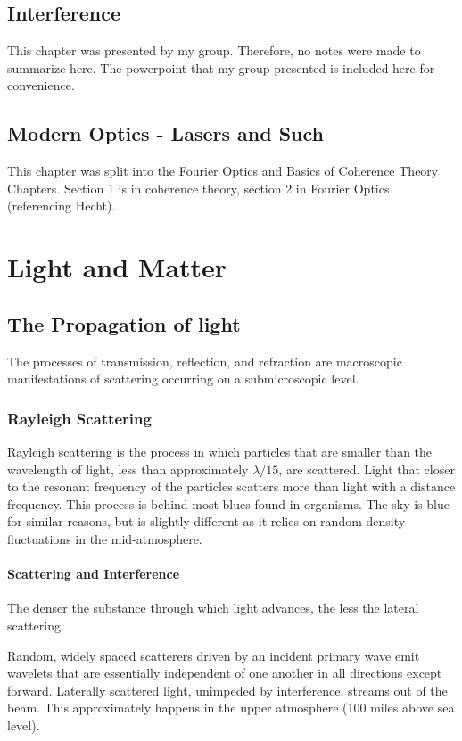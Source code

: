 \documentclass[12pt]{report}
\begin{document}
\chapter{Interference}
This chapter was presented by my group. Therefore, no notes were made to summarize here. The powerpoint that my group presented is included here for convenience. 





\chapter{Modern Optics - Lasers and Such}
This chapter was split into the Fourier Optics and Basics of Coherence Theory Chapters. Section 1 is in coherence theory, section 2 in Fourier Optics (referencing Hecht). 


\part{Light and Matter}

\chapter{The Propagation of light}
The processes of transmission, reflection, and refraction are macroscopic manifestations of scattering occurring on a submicroscopic level. 
\section{Rayleigh Scattering}
Rayleigh scattering is the process in which particles that are smaller than the wavelength of light, less than approximately $\lambda/15$, are scattered. Light that closer to the resonant frequency of the particles scatters more than light with a distance frequency. This process is behind most blues found in organisms. The sky is blue for similar reasons, but is slightly different as it relies on random density fluctuations in the mid-atmosphere.
\subsection{Scattering and Interference} 
The denser the substance through which light advances, the less the lateral scattering. 

Random, widely spaced scatterers driven by an incident primary wave emit wavelets that are essentially independent of one another in all directions except forward. Laterally scattered light, unimpeded by interference, streams out of the beam. This approximately happens in the upper atmosphere (100 miles above sea level). 
\end{document}

